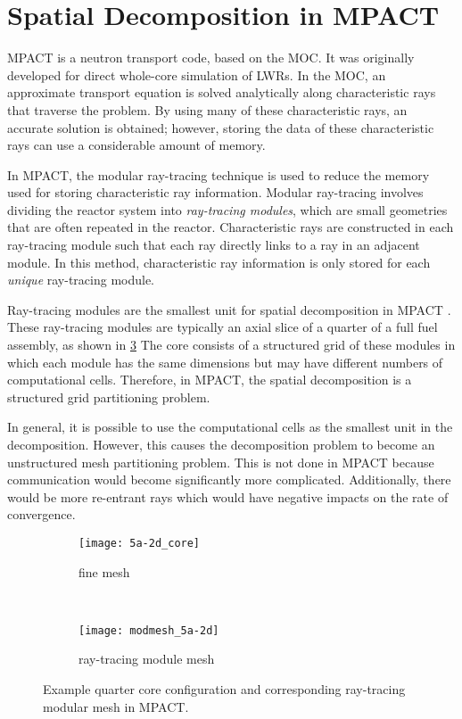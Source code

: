 {  \section{Spatial Decomposition in MPACT}{\label{sec:Spatial Decomposition:Spatial Decomposition in MPACT}
    MPACT is a neutron transport code, based on the \ac{MOC}.
    It was originally developed for direct whole-core simulation of \acp{LWR}.
    In the \ac{MOC}, an approximate transport equation is solved analytically along characteristic rays that traverse the problem.
    By using many of these characteristic rays, an accurate solution is obtained; however, storing the data of these characteristic rays can use a considerable amount of memory.

    In MPACT, the modular ray-tracing technique \cite{Saji2000} is used to reduce the memory used for storing characteristic ray information.
    Modular ray-tracing involves dividing the reactor system into \emph{ray-tracing modules}, which are small geometries that are often repeated in the reactor.
    Characteristic rays are constructed in each ray-tracing module such that each ray directly links to a ray in an adjacent module.
    In this method, characteristic ray information is only stored for each \emph{unique} ray-tracing module.

    Ray-tracing modules are the smallest unit for spatial decomposition in MPACT \cite{StimpsonPartitioning2017}.
    These ray-tracing modules are typically an axial slice of a quarter of a full fuel assembly, as shown in \cref{fig:Spatial Decomposition:5a-2d abstraction}
    The core consists of a structured grid of these modules in which each module has the same dimensions but may have different numbers of computational cells.
    Therefore, in MPACT, the spatial decomposition is a structured grid partitioning problem.

    In general, it is possible to use the computational cells as the smallest unit in the decomposition.
    However, this causes the decomposition problem to become an unstructured mesh partitioning problem.
    This is not done in MPACT because communication would become significantly more complicated.
    Additionally, there would be more re-entrant rays which would have negative impacts on the rate of convergence.

    \begin{figure}
      \centering
      \begin{subfigure}[t]{0.45\textwidth}
        \centering
        \texttt{[image: 5a-2d\_core]}
        \caption{fine mesh\label{fig:Spatial Decomposition:5a-2d configuration}}
      \end{subfigure}%
      ~
      \begin{subfigure}[t]{0.45\textwidth}
        \centering
        \texttt{[image: modmesh\_5a-2d]}
        \caption{ray-tracing module mesh\label{fig:Spatial Decomposition:5a-2d modular mesh}}
      \end{subfigure}
      \caption{Example quarter core configuration and corresponding ray-tracing modular mesh in MPACT. \label{fig:Spatial Decomposition:5a-2d abstraction}}
    \end{figure}

}}
